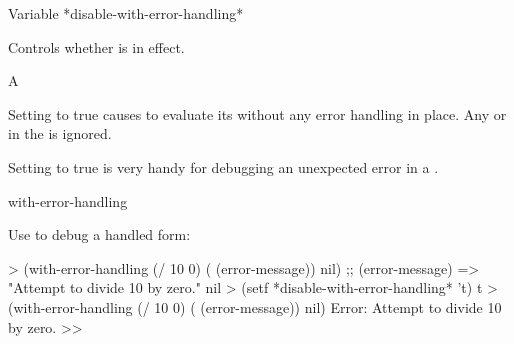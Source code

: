 \documentclass[10pt,twoside,english,pdftex]{article}
\begin{document}
\begin{functiondoc}{Variable}%
{*disable-with-error-handling*}{}%

\fnsyntax

\fnpurpose Controls whether  is
in effect.

\fnpackage {}

\fnmodule {}

\fnvaluetype A 

\fninitialvalue \nil

\fndescription Setting  to true
causes  to evaluate its
 without any error handling in place.  Any
 or  in the
 is ignored. 

Setting  to true is very handy
for debugging an unexpected error in a
 .

\begin{alsos}{with-error-handling}
\end{alsos}

\fnexample
{}%
% 
Use  to debug a handled form:
%
\W\supp
\begin{example}
  > (with-error-handling (/ 10 0) ( (error-message)) nil)
  ;;  (error-message) => "Attempt to divide 10 by zero."
  nil 
  > (setf *disable-with-error-handling* 't)
  t
  > (with-error-handling (/ 10 0) ( (error-message)) nil)
  Error: Attempt to divide 10 by zero.
  >>
\end{example}

\end{functiondoc}

\end{document}
